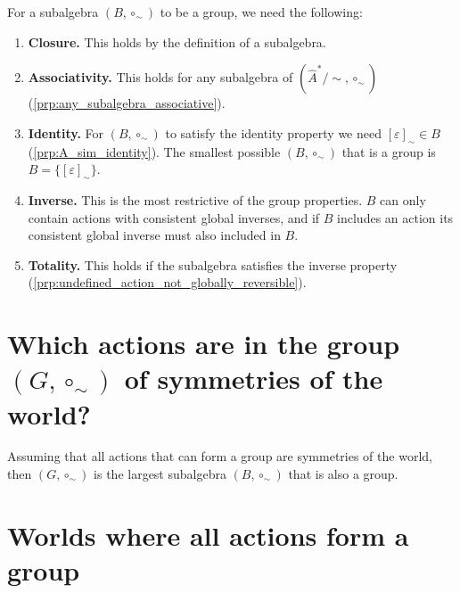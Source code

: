 For a subalgebra $(B, \circ_{\sim})$ to be a group, we need the following:
\begin{enumerate}
    \item \textbf{Closure.}
    This holds by the definition of a subalgebra.
    
    \item \textbf{Associativity.}
    This holds for any subalgebra of $(\hat{A}^{*}/\sim, \circ_{\sim})$ (\cref{prp:any_subalgebra_associative}).

    \item \textbf{Identity.}
    For $(B, \circ_{\sim})$ to satisfy the identity property we need $[\varepsilon]_{\sim} \in B$ (\cref{prp:A_sim_identity}).
    The smallest possible $(B, \circ_{\sim})$ that is a group is $B = \{ [\varepsilon]_{\sim} \}$.

    \item \textbf{Inverse.}
    This is the most restrictive of the group properties.
    $B$ can only contain actions with consistent global inverses, and if $B$ includes an action its consistent global inverse must also included in $B$.

    \item \textbf{Totality.}
    This holds if the subalgebra satisfies the inverse property (\cref{prp:undefined_action_not_globally_reversible}).
\end{enumerate}




\section{Which actions are in the group \texorpdfstring{$(G, \circ_{\sim})$}{} of symmetries of the world?}


Assuming that all actions that can form a group are symmetries of the world, then $(G, \circ_{\sim})$ is the largest subalgebra $(B, \circ_{\sim})$ that is also a group.

\section{Worlds where all actions form a group}

